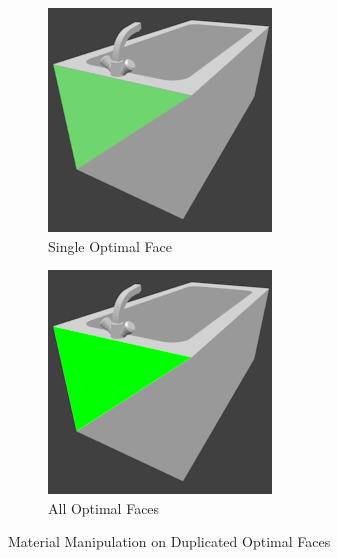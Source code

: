 \begin{figure}
	\centering
	\begin{subfigure}{.49\textwidth}
		\centering
		\includegraphics[width=.7\textwidth]{images/optimal_face_single.png}
		\caption{Single Optimal Face}
		\label{fig:optimal-face-single}
	\end{subfigure}
	\begin{subfigure}{.49\textwidth}
		\centering
		\includegraphics[width=.7\textwidth]{images/optimal_face_all.png}
		\caption{All Optimal Faces}
		\label{fig:optimal-face-all}
	\end{subfigure}
	\caption{Material Manipulation on Duplicated Optimal Faces}
	\label{fig:optimal-face}
\end{figure}

